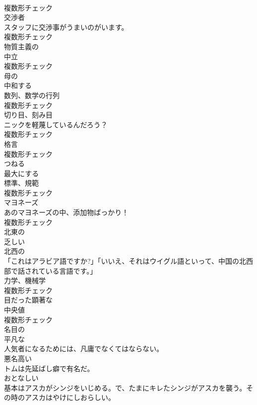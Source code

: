 \documentclass[8pt]{extreport}
\begin{document}
\begin{CJK}{UTF8}{min}
\\	複数形チェック
\\	[名詞]	交渉者	
\\	スタッフに交渉事がうまいのがいます。	
\\	複数形チェック
\\	[形容詞]	物質主義の	
\\	[名詞]	中立	
\\	複数形チェック
\\	[形容詞]	母の	
\\	[動詞]	中和する	
\\	[名詞]	数列、数学の行列	
\\	複数形チェック
\\	[名詞]	切り目、刻み目	
\\	ニックを軽蔑しているんだろう？	
\\	複数形チェック
\\	[名詞]	格言	
\\	複数形チェック
\\	[動詞]	つねる	
\\	[動詞]	最大にする	
\\	[名詞]	標準、規範	
\\	複数形チェック
\\	[名詞]	マヨネーズ	
\\	あのマヨネーズの中、添加物ばっかり！	
\\	複数形チェック
\\	[形容詞]	北東の	
\\	[形容詞]	乏しい	
\\	[形容詞]	北⻄の	
\\	「これはアラビア語ですか?」「いいえ、それはウイグル語といって、中国の北西部で話されている言語です。」	
\\	[名詞]	力学、機械学	
\\	複数形チェック
\\	[形容詞]	目だった顕著な	
\\	[名詞]	中央値	
\\	複数形チェック
\\	[形容詞]	名目の	
\\	[形容詞]	平凡な	
\\	人気者になるためには、凡庸でなくてはならない。	
\\	[形容詞]	悪名高い	
\\	トムは先延ばし癖で有名だ。	
\\	[形容詞]	おとなしい	
\\	基本はアスカがシンジをいじめる。で、たまにキレたシンジがアスカを襲う。その時のアスカはやけにしおらしい。	

\end{CJK}
\end{document}
